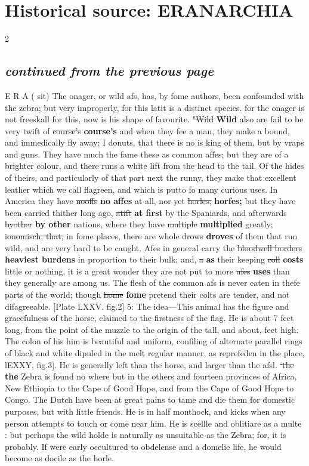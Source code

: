 \documentclass[10pt]{article}
\begin{document}
\section*{Historical source: ERANARCHIA}
\begin{multicols}{2}
\subsection*{\textit{continued from the previous page}}
E R A ( sit) The onager, or wild afs, has, by fome authors, been confounded with the zebra; but very improperly, for this latit is a distinct species. for the onager is not freeskall for this, now is his shape of favourite. \sout{"Wild} \textbf{Wild} also are fail to be very twift of \sout{course’s} \textbf{course's} and when they fee a man, they make a bound, and immedically fly away; I donuts, that there is no is king of them, but by vraps and guns. They have much the fame these as common affes; but they are of a brighter colour, and there runs a white lift from the head to the tail. Of the hides of theirs, and particularly of that part next the runny, they make that excellent leather which we call flagreen, and which is putto fo many curious uses. In America they have \sout{nooffs} \textbf{no affes} at all, nor yet \sout{horles;} \textbf{horfes;} but they have been carried thither long ago, \sout{atift} \textbf{at first} by the Spaniards, and afterwards \sout{byother} \textbf{by other} nations, where they have \sout{multiple} \textbf{multiplied} greatly; \sout{ionomisch, that,} in fome places, there are whole \sout{drows} \textbf{droves} of them that run wild, and are very hard to be caught. Afes in general carry the \sout{bloodwell borders} \textbf{heaviest burdens} in proportion to their bulk; and, \sout{a} \textbf{as} their keeping \sout{coll} \textbf{costs} little or nothing, it is a great wonder they are not put to more \sout{ufes} \textbf{uses} than they generally are among us. The flesh of the common afs is never eaten in thefe parts of the world; though \sout{home} \textbf{fome} pretend their colts are tender, and not difagreeable. [Plate LXXV. fig.2] 5: The idea—This animal has the figure and gracefulness of the horse, claimed to the firstness of the flag. He is about 7 feet long, from the point of the muzzle to the origin of the tall, and about, feet high. The colon of his him is beautiful and uniform, confiling of alternate parallel rings of black and white dipuled in the melt regular manner, as reprefeden in the place, lEXXY, fig.3]. He is generally left than the horse, and larger than the afsl. \sout{‘the} \textbf{the} Zebra is found no where but in the others and fourteen provinces of Africa, New Ethiopia to the Cape of Good Hope, and from the Cape of Good Hope to Congo. The Dutch have been at great pains to tame and die them for domestic purposes, but with little friends. He is in half monthock, and kicks when any person attempts to touch or come near him. He is scellle and oblitiare as a multe : but perhaps the wild holde is naturally as unsuitable as the Zebra; for, it is probably. If were early occultured to obdelense and a domelie life, he would become as docile as the horle.


\end{multicols}
\end{document}
